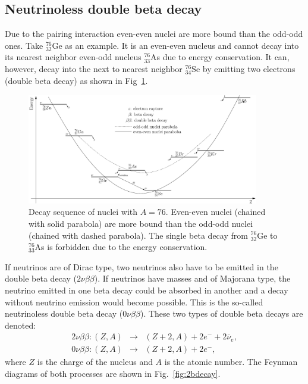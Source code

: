 \subsection{Neutrinoless double beta decay}
\label{sec:nonubb}
Due to the pairing interaction even-even nuclei are more bound than the odd-odd ones. Take $^{76}_{32}$Ge as an example. It is an even-even nucleus and cannot decay into its nearest neighbor even-odd nucleus $^{76}_{33}$As due to energy conservation. It can, however, decay into the next to nearest neighbor $^{76}_{34}$Se by emitting two electrons (double beta decay) as shown in Fig~\ref{fig:ee2oo}. 
\begin{figure}[tbhp]
  \centering
  \includegraphics[width=0.9\textwidth]{Espec0nu2b.eps}  
  \caption{Decay sequence of nuclei with $A=76$. Even-even nuclei     (chained with solid parabola) are more bound than the odd-odd     nuclei (chained with dashed parabola). The single beta decay from     $^{76}_{32}$Ge to $^{76}_{33}$As is forbidden due to the energy     conservation.}
  \label{fig:ee2oo}
\end{figure}
If neutrinos are of Dirac type, two neutrinos also have to be emitted in the double beta decay ($2\nu\beta\beta$). If neutrinos have masses and of Majorana type, the neutrino emitted in one beta decay could be absorbed in another and a decay without neutrino emission would become possible. This is the so-called neutrinoless double beta decay ($0\nu\beta\beta$). These two types of double beta decays are denoted:
\begin{eqnarray}
  2\nu\beta\beta: (Z,A) &\rightarrow& (Z+2,A) + 2e^{-} +
  2\bar{\nu}_{e}, \\\label{eq:2nu2b}
  0\nu\beta\beta: (Z,A) &\rightarrow& (Z+2,A) + 2e^{-},
\label{eq:0nu2b}
\end{eqnarray}
where $Z$ is the charge of the nucleus and $A$ is the atomic number.
The Feynman diagrams of both processes are shown in
Fig.~\ref{fig:2bdecay}.
